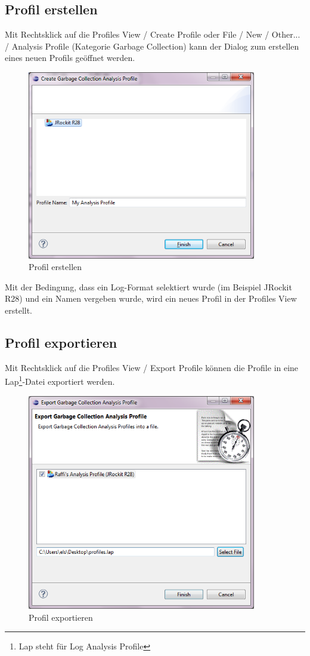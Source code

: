 \subsection{Profil erstellen}
Mit Rechtsklick auf die Profiles View / Create Profile oder File / New / Other... / Analysis Profile (Kategorie Garbage Collection) kann der Dialog zum erstellen eines neuen Profils geöffnet werden. 
 \begin{figure}[H]
  	\centering
    	\includegraphics[width=10cm]{images/tutorial_newprofile}
        	\caption{Profil erstellen}
\end{figure}
Mit der Bedingung, dass ein Log-Format selektiert wurde (im Beispiel JRockit R28) und ein Namen vergeben wurde, wird ein neues Profil in der Profiles View erstellt.

\subsection{Profil exportieren}
Mit Rechtsklick auf die Profiles View / Export Profile können die Profile in eine Lap\footnote{Lap steht für Log Analysis Profile}-Datei exportiert werden.
 \begin{figure}[H]
  	\centering
    	\includegraphics[width=10cm]{images/tutorial_exportprofile}
        	\caption{Profil exportieren}
\end{figure}

